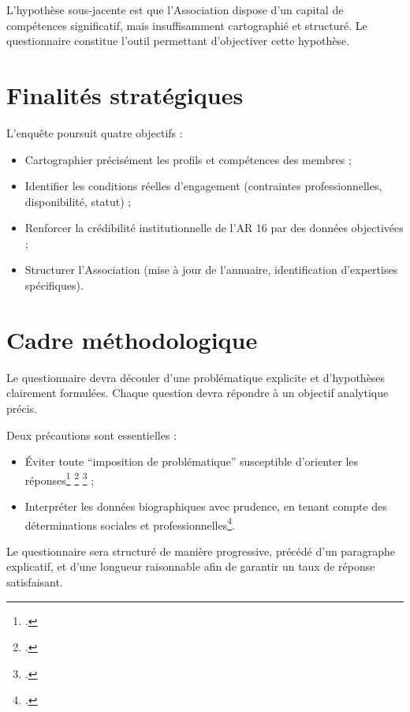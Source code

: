 \documentclass[12pt,a4paper]{article}
\begin{document}
L'hypothèse sous-jacente est que l'Association dispose d'un capital de compétences significatif, mais insuffisamment cartographié et structuré. Le questionnaire constitue l'outil permettant d'objectiver cette hypothèse.

\section{Finalités stratégiques}

L'enquête poursuit quatre objectifs :

\begin{itemize}
    \item Cartographier précisément les profils et compétences des membres ;
    \item Identifier les conditions réelles d'engagement (contraintes professionnelles, disponibilité, statut) ;
    \item Renforcer la crédibilité institutionnelle de l'AR 16 par des données objectivées ;
    \item Structurer l'Association (mise à jour de l'annuaire, identification d'expertises spécifiques).
\end{itemize}

\newpage

\section{Cadre méthodologique}

Le questionnaire devra découler d'une problématique explicite et d'hypothèses clairement formulées. Chaque question devra répondre à un objectif analytique précis.

Deux précautions sont essentielles :

\begin{itemize}
    \item Éviter toute \enquote{imposition de problématique} susceptible d'orienter les réponses\footcite{Bourdieu1980} \footcite[70]{DeSingly2020} \footcite[84]{Fenneteau2015} ;
    \item Interpréter les données biographiques avec prudence, en tenant compte des déterminations sociales et professionnelles\footcite[45]{Bourdieu1980}.
\end{itemize}

Le questionnaire sera structuré de manière progressive, précédé d'un paragraphe explicatif, et d'une longueur raisonnable afin de garantir un taux de réponse satisfaisant.
\end{document}

